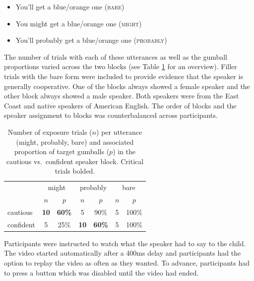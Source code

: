 \documentclass[10pt,letterpaper]{article}
\begin{document}
\begin{itemize}
\item You'll get a blue/orange one (\textsc{bare})
\item You might get a blue/orange one (\textsc{might})
\item You'll probably get a blue/orange one (\textsc{probably})
\end{itemize}


The number of trials with each of these utterances as well as the gumball proportions varied across the two blocks (see Table \ref{tab:materials} for an overview). Filler trials with the bare form were included to provide evidence that the speaker is generally cooperative. One of the blocks always showed a female speaker and the other block always showed a male speaker. Both speakers were from the East Coast and native speakers of American English. The order of blocks and the speaker assignment to blocks was counterbalanced across participants. 

\begin{table}
\centering
\begin{tabular}{l c c c c c c}
\toprule
& \multicolumn{2}{c}{\sc might} & \multicolumn{2}{c}{\sc probably} & \multicolumn{2}{c}{\sc bare}\\
& $n$ & $p$ & $n$ & $p$ & $n$ & $p$\\
\midrule
cautious & {\bf 10} & {\bf 60\%} & 5 & 90\% & 5 & 100\%\\
confident & 5 & 25\% & {\bf 10}  & {\bf 60\%} & 5  & 100\%\\  
\bottomrule
\end{tabular}
\caption{Number of exposure trials ($n$) per utterance ({\sc might}, {\sc probably}, {\sc bare}) and associated proportion of target gumballs ($p$) in the cautious vs.~confident speaker block. Critical trials bolded. \label{tab:materials}}

\end{table}

Participants were instructed to watch what the speaker had to say to the child. The video started automatically after a 400ms delay and participants had the option to replay the video as often as they wanted. To advance, participants had to press a button which was disabled until the video had ended.
\end{document}
